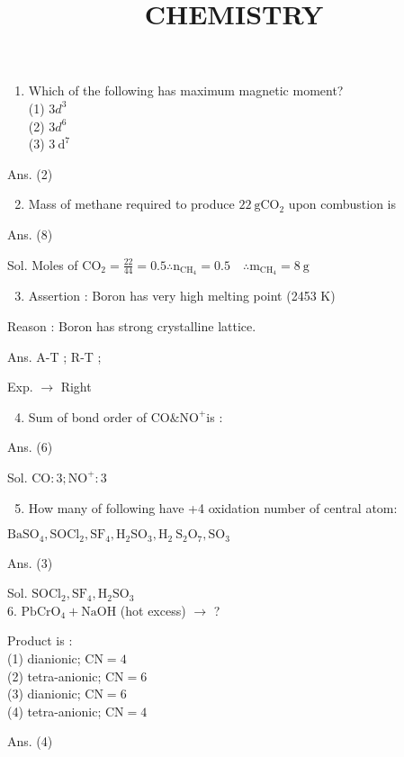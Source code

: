 \documentclass[10pt]{article}
\title{CHEMISTRY }
\author{}
\date{}
\begin{document}
\maketitle
\begin{enumerate}
  \item Which of the following has maximum magnetic moment?\\
(1) $3 d^{3}$\\
(2) $3 d^{6}$\\
(3) $3 \mathrm{~d}^{7}$
\end{enumerate}

Ans. (2)

\begin{enumerate}
  \setcounter{enumi}{1}
  \item Mass of methane required to produce $22 \mathrm{~g} \mathrm{CO}_{2}$ upon combustion is
\end{enumerate}

Ans. (8)

Sol. Moles of $\mathrm{CO}_{2}=\frac{22}{44}=0.5 \therefore \mathrm{n}_{\mathrm{CH}_{4}}=0.5 \quad \therefore \mathrm{m}_{\mathrm{CH}_{4}}=8 \mathrm{~g}$

\begin{enumerate}
  \setcounter{enumi}{2}
  \item Assertion : Boron has very high melting point (2453 K)
\end{enumerate}

Reason : Boron has strong crystalline lattice.

Ans. A-T ; R-T ;

Exp. $\rightarrow$ Right

\begin{enumerate}
  \setcounter{enumi}{3}
  \item Sum of bond order of $\mathrm{CO} \& \mathrm{NO}^{+}$is :
\end{enumerate}

Ans. (6)

Sol. $\mathrm{CO}: 3 ; \mathrm{NO}^{+}: 3$

\begin{enumerate}
  \setcounter{enumi}{4}
  \item How many of following have +4 oxidation number of central atom:
\end{enumerate}

$\mathrm{BaSO}_{4}, \mathrm{SOCl}_{2}, \mathrm{SF}_{4}, \mathrm{H}_{2} \mathrm{SO}_{3}, \mathrm{H}_{2} \mathrm{~S}_{2} \mathrm{O}_{7}, \mathrm{SO}_{3}$

Ans. (3)

Sol. $\mathrm{SOCl}_{2}, \mathrm{SF}_{4}, \mathrm{H}_{2} \mathrm{SO}_{3}$\\
6. $\mathrm{PbCrO}_{4}+\mathrm{NaOH}$ (hot excess) $\longrightarrow$ ?

Product is :\\
(1) dianionic; $\mathrm{CN}=4$\\
(2) tetra-anionic; $\mathrm{CN}=6$\\
(3) dianionic; $\mathrm{CN}=6$\\
(4) tetra-anionic; $\mathrm{CN}=4$

Ans. (4)
\end{document}
